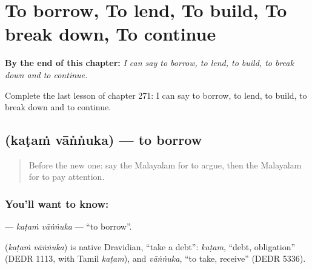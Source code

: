 
\chapter{To borrow, To lend, To build, To break down, To continue}
\label{ch:ml-to-borrow-to-lend-to-build-to-break-down-to-continue}

\begin{chapteropening}
\textbf{By the end of this chapter:} \emph{I can say to borrow, to lend, to build, to break down and to continue.}

Complete the last lesson of chapter 271: I can say to borrow, to lend, to build, to break down and to continue.
\end{chapteropening}

\section[\texorpdfstring{\ml{കടം} \ml{വാങ്ങുക} (kaṭaṁ vāṅṅuka)}{കടം വാങ്ങുക (kaṭaṁ vāṅṅuka)}]{  (kaṭaṁ vāṅṅuka) — to borrow}

\label{lesson:ML-C271-katam-vannuka}



\begin{quote}
Before the new one: say the Malayalam for to argue, then the Malayalam for to pay attention.
\end{quote}

\subsection*{You'll want to know:  }
\textbf{ } — \emph{kaṭaṁ vāṅṅuka} — \textquotedblleft{}to borrow\textquotedblright{}.

\begin{cousinweb}
\textbf{ } (\emph{kaṭaṁ vāṅṅuka}) is native Dravidian, \textquotedblleft{}take a debt\textquotedblright{}: \emph{kaṭam}, \textquotedblleft{}debt, obligation\textquotedblright{} (DEDR 1113, with Tamil \emph{kaṭam}), and \emph{vāṅṅuka}, \textquotedblleft{}to take, receive\textquotedblright{} (DEDR 5336).
\end{cousinweb}

